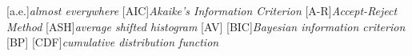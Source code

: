 \usepackage{acronym}
[a.e.]{\textit{almost everywhere}}
[AIC]{\textit{Akaike's Information Criterion}}
[A-R]{\textit{Accept-Reject Method}}
[ASH]{\textit{average shifted histogram}}
[AV]{}
[BIC]{\textit{Bayesian information criterion}}
[BP]{}
[CDF]{\textit{cumulative distribution function}}
